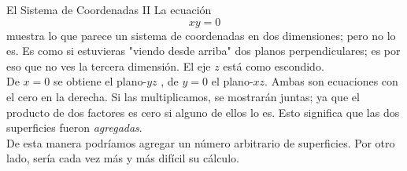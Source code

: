 \begin{surferPage}{El Sistema de Coordenadas II}
La ecuaci{\'o}n
\[xy=0\]
muestra lo que parece un sistema de coordenadas en dos dimensiones; pero no lo es. Es como si estuvieras "viendo desde arriba" dos planos perpendiculares; es por eso que no ves la tercera dimensi{\'o}n. El eje $z$ est{\'a} como escondido. \\
\vspace{0.3cm}
De $x=0$ se obtiene el plano-$yz$ , de $y=0$ el plano-$xz$.
Ambas son ecuaciones con el cero en la derecha. Si las multiplicamos, se mostrar{\'a}n juntas; ya que el producto de dos factores es cero si alguno de ellos lo es. Esto significa que las dos superficies fueron {\it agregadas}. \\
De esta manera podr{\'i}amos agregar un n{\'u}mero arbitrario de superficies. Por otro lado, ser{\'i}a cada vez m{\'a}s y m{\'a}s dif{\'i}cil su c{\'a}lculo.
\end{surferPage}
